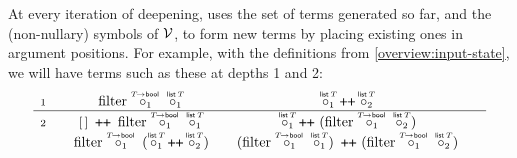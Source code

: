 \begin{comment}
\ES{This explanation can be done in two steps. Create terms as sygus would, then replace uninterpreted values with symbolic examples}
The first thing the synthesizer does is generate \emph{symbolic values} used to discriminate different terms.
There are two kinds of symbolic values at play, \emph{uninterpreted constants} (sometimes called \emph{symbolic constants}) and \emph{symbolic expressions}.
For all types, uninterpreted constants are generated to represent arbitrary, opaque values inhabiting them.
For symbolic expressions, we will make a distinction between types.
Types whose constructors are in $\Constr$, we will call \emph{open} types, and the rest, we will call \emph{closed} types.
For open types, symbolic expressions are constructed by composing the constructors up to depth $c$.
Each symbolic expression is therefore an expression containing a mixture of symbols from $\Constr$ and (typed) uninterpreted constants.

In the running example, only the type family $\tlist~T$ is open.
Type variables are not instantiated, which leaves the types $T$ and
$T\to\tbool$ as closed types (in principle, also $\tbool$ itself, but since
it does not occur in any function argument position it does not contribute
to the synthesis space). Let $e_1, e_2$ be symbolic constants of type $T$,
$l_1, l_2$ of type $\tlist~T$, and $p_1, p_2$ of type $T\to\tbool$.
In addition to those, additional symbolic constants of type $T$ $v_1, v_2$ are created; to be used solely in the symbolic expressions $\textrm{[]}$, $v_1\cons\textrm{[]}$, and $v_2\cons v_1 \cons \textrm{[]}$ which are also generated.
\end{comment}

At every iteration of deepening, \TheSy uses the set of terms generated so far, and the (non-nullary) symbols of $\mathcal{V}$, to form new terms by placing existing ones in argument positions.
For example, with the definitions from \autoref{overview:input-state},
we will have terms such as these at depths 1 and 2:
\bgroup
\renewcommand\arraystretch{1.4}
\begin{equation}\label{overview:example-terms}
\begin{array}{l@{\qquad}c@{\qquad}c@{\qquad}}
  {\scriptstyle 1} &
  \tfilter\,\pholder{1}{\!T\!\to\tbool}~\pholder{1}{\tlist\,T} &
  \pholder{1}{\tlist\,T} \concat \pholder{2}{\tlist\,T}
\\ \hline
  {\scriptstyle 2} &
  \lnil ~\concat~
  \tfilter\,\pholder{1}{\!T\!\to\tbool}~\pholder{1}{\tlist\,T} &
  \pholder{1}{\tlist\,T} \concat 
    ~(\tfilter\,\pholder{1}{\!T\!\to\tbool}~\pholder{2}{\tlist\,T})
\\
  & 
  \tfilter\,\pholder{1}{\!T\!\to\tbool}~
    (\pholder{1}{\tlist\,T} \concat \pholder{2}{\tlist\,T})  &
  (\tfilter\,\pholder{1}{\!T\!\to\tbool}~\pholder{1}{\tlist\,T})
    ~\concat ~
    (\tfilter\,\pholder{1}{\!T\!\to\tbool}~\pholder{2}{\tlist\,T})
\end{array}
\end{equation}
\egroup

